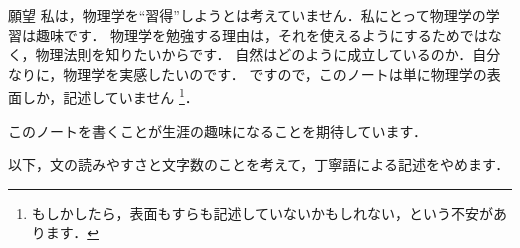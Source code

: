 \begin{aboutthisnote}{願望}
    私は，物理学を“習得”しようとは考えていません．私にとって物理学の学習は趣味です．
    物理学を勉強する理由は，それを使えるようにするためではなく，物理法則を知りたいからです．
    自然はどのように成立しているのか．自分なりに，物理学を実感したいのです．
    ですので，このノートは単に物理学の表面しか，記述していません
        \footnote{
            もしかしたら，表面もすらも記述していないかもしれない，という不安があります．
        }．

    このノートを書くことが生涯の趣味になることを期待しています．
\end{aboutthisnote}


    以下，文の読みやすさと文字数のことを考えて，丁寧語による記述をやめます．
